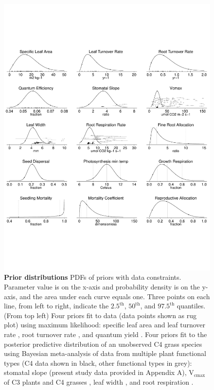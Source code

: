 \documentclass[12pt]{article}
\begin{document}
\begin{flushleft}
\begin{spacing}{1.9}
\begin{figure}
    \begin{centering}
    \includegraphics[width=6.5in]{priorfigures.pdf}
    \caption{{\bf Prior distributions} PDFs of priors with data constraints. 
      Parameter value is on the x-axis and probability density is on the y-axis, and the area under each curve equals one. 
      Three points on each line, from left to right, indicate the $2.5^{\text{th}}$, $50^{\text{th}}$, and $97.5^{\text{th}}$ quantiles. 
      (From top left) Four priors fit to data (data points shown as rug plot) using maximum likelihood: specific leaf area and leaf turnover rate \citep{wright2004wwl}, root turnover rate \citep{gill2000gpr}, and quantum yield \citep{skillman2008qyv}. 
      Four priors fit to the posterior predictive distribution of an unobserved C4 grass species using Bayesian meta-analysis of data from multiple plant functional types (C4 data shown in black, other functional types in grey): stomatal slope (present study data provided in Appendix A), V$_{\text{cmax}}$ of C3 plants \citep{wullschleger1993blc} and C4 grasses \citep{kubien2005ltp,massad2007etc,wang2011icp}, leaf width \citep{oyarzabal2008tdb}, and root respiration \citep{tjoelker2005llr}. 
}
\end{centering}
\end{figure}
\end{spacing}
\end{flushleft}
\end{document}
